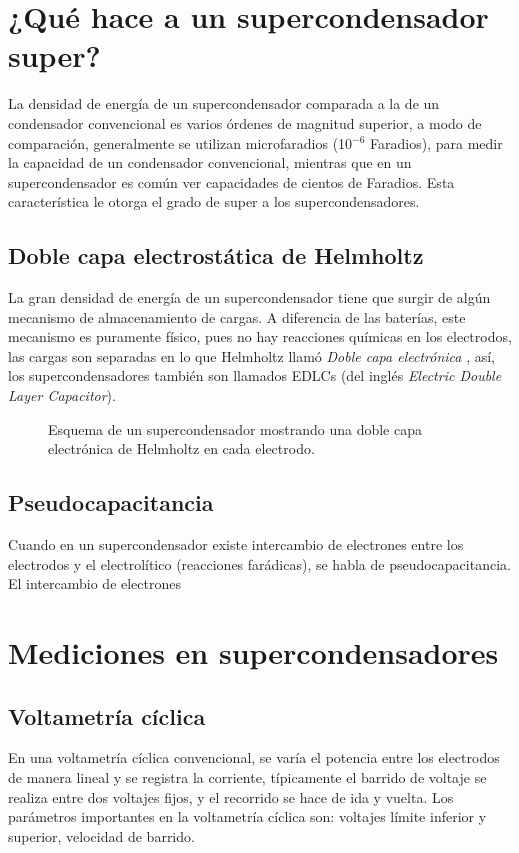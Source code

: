 \section{¿Qué hace a un supercondensador super?}
La densidad de energía de un supercondensador comparada a la de un condensador convencional es varios órdenes de magnitud superior, a modo de comparación, generalmente se utilizan microfaradios (10$^{-6}$ Faradios), para medir la capacidad de un condensador convencional, mientras que en un supercondensador es común ver capacidades de cientos de Faradios. Esta característica le otorga el grado de super a los supercondensadores.

\subsection{Doble capa electrostática de Helmholtz}
La gran densidad de energía de un supercondensador tiene que surgir de algún mecanismo de almacenamiento de cargas. A diferencia de las baterías, este mecanismo es puramente físico, pues no hay reacciones químicas en los electrodos, las cargas son separadas en lo que Helmholtz llamó \emph{Doble capa electrónica} \citep{Frackowiak2001}, así, los supercondensadores también son llamados EDLCs (del inglés \emph{Electric Double Layer Capacitor}).

\begin{figure}[h!]
	\centering
	\caption{Esquema de un supercondensador mostrando una doble capa electrónica de Helmholtz en cada electrodo.}
	\label{fig:edlc}
\end{figure}

\subsection{Pseudocapacitancia}
Cuando en un supercondensador existe intercambio de electrones entre los electrodos y el electrolítico (reacciones farádicas), se habla de pseudocapacitancia. El intercambio de electrones 


\section{Mediciones en supercondensadores}

\subsection{Voltametría cíclica}
En una voltametría cíclica convencional, se varía el potencia entre los electrodos de manera lineal y se registra la corriente, típicamente el barrido de voltaje se realiza entre dos voltajes fijos, y el recorrido se hace de ida y vuelta. Los parámetros importantes en la voltametría cíclica son: voltajes límite inferior y superior, velocidad de barrido.

